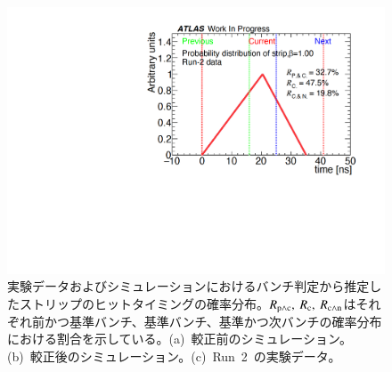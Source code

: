 \begin{figure}[H]
\begin{minipage}{0.33\hsize}
    \subcaption{}
    \end{minipage}
    \begin{minipage}{0.33\hsize}
    \centering   
    \includegraphics[width=\textwidth,page=1]{img/rec/rec_data_s.pdf}
    \subcaption{}
    \end{minipage} 
    \caption[実験データおよびシミュレーションにおけるバンチ判定から推定したストリップのヒットタイミングの確率分布]{実験データおよびシミュレーションにおけるバンチ判定から推定したストリップのヒットタイミングの確率分布。$R_{\rm{p{\land}c}},~R_{\rm{c}},~R_{\rm{c{\land}n}}$はそれぞれ前かつ基準バンチ、基準バンチ、基準かつ次バンチの確率分布における割合を示している。(a)~較正前のシミュレーション。(b)~較正後のシミュレーション。(c)~Run~2~の実験データ。}\label{fig:recall1}
\end{figure}

